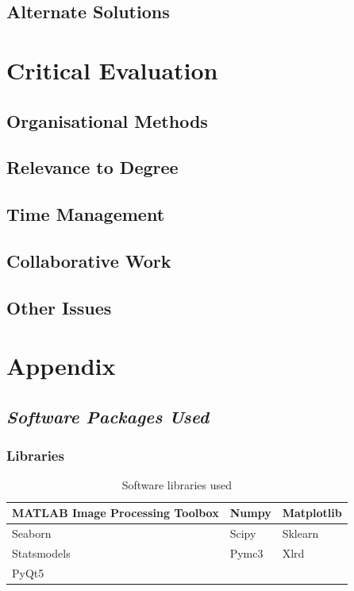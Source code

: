 \documentclass[11pt]{report}
\begin{document}
\section{Alternate Solutions}
\label{sec-5-2}

\chapter{Critical Evaluation}
\label{sec-6}
\section{Organisational Methods}
\label{sec-6-1}
\section{Relevance to Degree}
\label{sec-6-2}
\section{Time Management}
\label{sec-6-3}
\section{Collaborative Work}
\label{sec-6-4}
\section{Other Issues}
\label{sec-6-5}

\chapter{Appendix}
\label{sec-7}
\section{\emph{Software Packages Used}}
\label{sec-7-1}

\subsection{Libraries}
\label{sec-7-1-1}
\begin{table}[htb]
\caption{\label{tab:software}Software libraries used}
\centering
\begin{tabularx}{\textwidth}{|X|X|X|}
\hline
MATLAB Image Processing Toolbox & Numpy & Matplotlib\\
\hline
Seaborn & Scipy & Sklearn\\
\hline
Statsmodels & Pymc3 & Xlrd\\
\hline
PyQt5 &  & \\
\hline
\end{tabularx}
\end{table}
\end{document}
